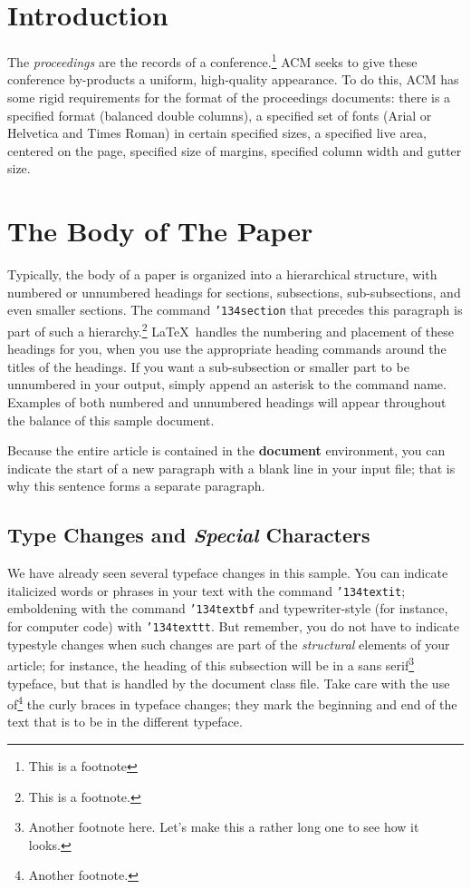 \section{Introduction}

The \textit{proceedings} are the records of a conference.\footnote{This
is a footnote}  ACM seeks
to give these conference by-products a uniform, high-quality
appearance. To do this, ACM has some rigid requirements for the
format of the proceedings documents: there is a specified format
(balanced double columns), a specified set of fonts (Arial or
Helvetica and Times Roman) in certain specified sizes, a specified
live area, centered on the page, specified size of margins, specified
column width and gutter size.


\section{The Body of The Paper}
Typically, the body of a paper is organized into a hierarchical
structure, with numbered or unnumbered headings for sections,
subsections, sub-subsections, and even smaller sections. The command
\texttt{{\char'134}section} that precedes this paragraph is part of
such a hierarchy.\footnote{This is a footnote.} \LaTeX\ handles the
numbering and placement of these headings for you, when you use the
appropriate heading commands around the titles of the headings. If
you want a sub-subsection or smaller part to be unnumbered in your
output, simply append an asterisk to the command name. Examples of
both numbered and unnumbered headings will appear throughout the
balance of this sample document.

Because the entire article is contained in the \textbf{document}
environment, you can indicate the start of a new paragraph with a
blank line in your input file; that is why this sentence forms a
separate paragraph.

\subsection{Type Changes and {\itshape Special} Characters}

We have already seen several typeface changes in this sample. You can
indicate italicized words or phrases in your text with the command
\texttt{{\char'134}textit}; emboldening with the command
\texttt{{\char'134}textbf} and typewriter-style (for instance, for
computer code) with \texttt{{\char'134}texttt}. But remember, you do
not have to indicate typestyle changes when such changes are part of
the \textit{structural} elements of your article; for instance, the
heading of this subsection will be in a sans serif\footnote{Another
footnote here. Let's make this a rather long one to see how it
looks.} typeface, but that is handled by the document class file.
Take care with the use of\footnote{Another footnote.}  the
curly braces in typeface changes; they mark the beginning and end of
the text that is to be in the different typeface.

